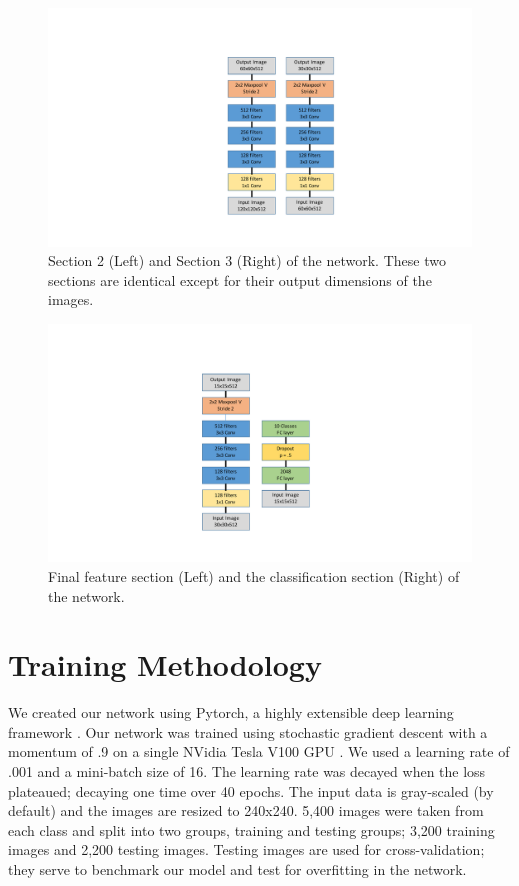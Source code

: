 \documentclass[11pt,conference]{ieeeconf}
\begin{document}
\begin{figure}[H]
\centering
\includegraphics[keepaspectratio=true,scale=0.6]{section2}
\caption{Section 2 (Left) and Section 3 (Right) of the network. These two sections are identical except for their output dimensions of the images.}\label{section2_3}
\end{figure}
%
\begin{figure}[H]
\centering
\includegraphics[keepaspectratio=true,scale=0.6]{section4}
\caption{Final feature section (Left) and the classification section (Right) of the network.}\label{section2_3}
\end{figure}
%
\section{Training Methodology}
We created our network using Pytorch, a highly extensible deep learning framework \cite{paszke2017automatic}. Our network was trained using stochastic gradient descent with a momentum of .9 on a single NVidia Tesla V100 GPU \cite{DBLP:journals/corr/KingmaB14, Sutskever:2013:IIM:3042817.3043064}. We used a learning rate of .001 and a mini-batch size of 16. The learning rate was decayed when the loss plateaued; decaying one time over 40 epochs. The input data is gray-scaled (by default) and the images are resized to 240x240. 5,400 images were taken from each class and split into two groups, training and testing groups; 3,200 training images and 2,200 testing images. Testing images are used for cross-validation; they serve to benchmark our model and test for overfitting in the network.
%
\end{document}
